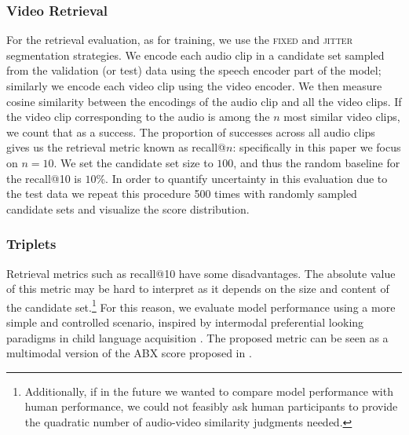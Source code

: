 \subsubsection{Video Retrieval}
\label{sec:retrieval}
For the retrieval evaluation, as for training, we use the
\textsc{fixed} and \textsc{jitter} segmentation strategies. We encode
each audio clip in a candidate set sampled from the validation (or
test) data using the speech encoder part of the model; similarly we encode each
video clip using the video encoder. We then measure cosine similarity
between the encodings of the audio clip and all the video clips. If the video clip
corresponding to the audio is among the $n$ most similar video clips,
we count that as a success. The proportion of successes across all
audio clips gives us the retrieval metric known as recall@$n$:
specifically in this paper we focus on $n=10$. We set the candidate
set size to $100$, and thus the random baseline for the recall@10 is
$10$\%. In order to quantify uncertainty in this evaluation due to the
test data we repeat this procedure 500 times with randomly sampled
candidate sets and visualize the score distribution.  


\subsubsection{Triplets}
\label{sec:triplets}
Retrieval metrics such as recall@10 have some disadvantages. The absolute value 
of this metric may be hard to interpret as it depends
on the size and content of the candidate set.\footnote{Additionally, if in the 
future
we wanted to compare model performance with human performance, we
could not feasibly ask human participants to provide the quadratic
number of audio-video similarity judgments needed.}
For this reason,
we evaluate model performance using a more simple and controlled scenario, 
inspired by intermodal preferential looking paradigms in child
language acquisition \citep{hirsh1996intermodal}. The proposed metric can be 
seen as a multimodal version of the ABX score proposed in \citet{schatz2016abx}.


